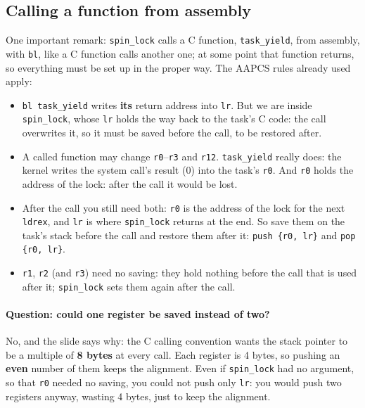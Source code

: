 \subsection{Calling a function from assembly}
One important remark: \texttt{spin\_lock} calls a C function, \texttt{task\_yield}, from assembly, with \texttt{bl}, like a C function calls another one; at some point that function returns, so everything must be set up in the proper way. The AAPCS rules already used apply:
\begin{itemize}
    \item \texttt{bl task\_yield} writes \textbf{its} return address into \texttt{lr}. But we are inside \texttt{spin\_lock}, whose \texttt{lr} holds the way back to the task's C code: the call overwrites it, so it must be saved before the call, to be restored after.
    \item A called function may change \texttt{r0}--\texttt{r3} and \texttt{r12}. \texttt{task\_yield} really does: the kernel writes the system call's result (0) into the task's \texttt{r0}. And \texttt{r0} holds the address of the lock: after the call it would be lost.
    \item After the call you still need both: \texttt{r0} is the address of the lock for the next \texttt{ldrex}, and \texttt{lr} is where \texttt{spin\_lock} returns at the end. So save them on the task's stack before the call and restore them after it: \texttt{push \{r0, lr\}} and \texttt{pop \{r0, lr\}}.
    \item \texttt{r1}, \texttt{r2} (and \texttt{r3}) need no saving: they hold nothing before the call that is used after it; \texttt{spin\_lock} sets them again after the call.
\end{itemize}
\paragraph{Question: could one register be saved instead of two?} No, and the slide says why: the C calling convention wants the stack pointer to be a multiple of \textbf{8 bytes} at every call. Each register is 4 bytes, so pushing an \textbf{even} number of them keeps the alignment. Even if \texttt{spin\_lock} had no argument, so that \texttt{r0} needed no saving, you could not push only \texttt{lr}: you would push two registers anyway, wasting 4 bytes, just to keep the alignment.

